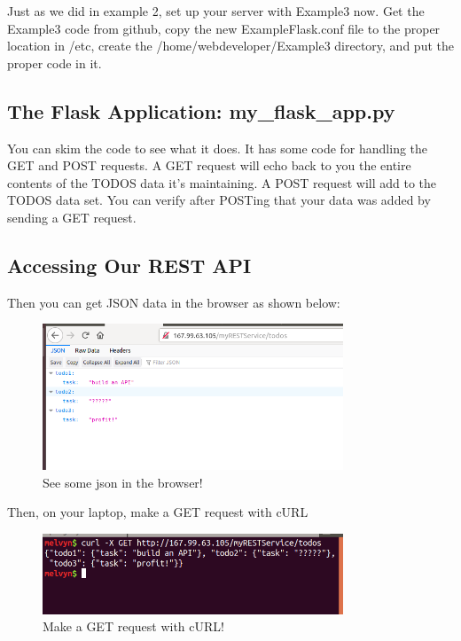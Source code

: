 \documentclass[10pt]{article}
\begin{document}
Just as we did in example 2, set up your server with Example3 now. Get the Example3 code from github, copy the new ExampleFlask.conf file to the proper location in /etc, create the /home/webdeveloper/Example3 directory, and put the proper code in it. 

\subsection{The Flask Application: my\_flask\_app.py}
You can skim the code to see what it does. It has some code for handling the GET and POST requests. A GET request will echo back to you the entire contents of the TODOS data it's maintaining. A POST request will add to the TODOS data set. You can verify after POSTing that your data was added by sending a GET request.



\subsection{Accessing Our REST API}
Then you can get JSON data in the browser as shown below:

\begin{figure}[h]
  \centering
    \includegraphics[width=0.8\textwidth]{restInBrowser.png}
  \caption{See some json in the browser!}
\end{figure}

Then, on your laptop, make a GET request with cURL


\begin{figure}[h]
  \centering
    \includegraphics[width=0.8\textwidth]{curlYourAPI.png}
  \caption{Make a GET request with cURL!}
\end{figure}
\end{document}
